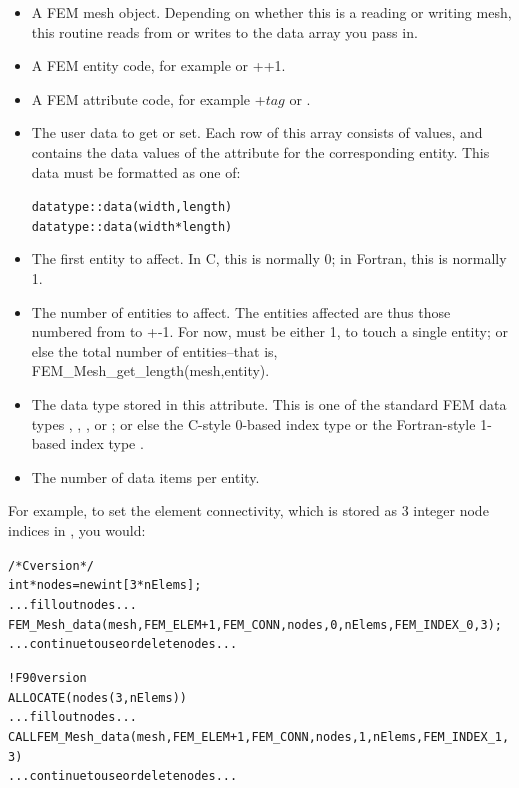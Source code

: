 \begin{itemize}
\item {} A FEM mesh object.  Depending on whether this is
   a reading or writing mesh, this routine reads from or writes to
   the data array you pass in.

\item {} A FEM entity code, for example  or
   ++1.

\item {} A FEM attribute code, for example +$tag$
   or .  
 
\item {} The user data to get or set.  Each row of this array consists
  of  values, and contains the data values of the attribute for the
  corresponding entity.  This data must be formatted as one of:
  \begin{alltt}
      datatype :: data(width,length)
      datatype :: data(width*length)
  \end{alltt}

\item {} The first entity to affect.  In C, this is normally 0;
  in Fortran, this is normally 1.

\item {} The number of entities to affect.  The entities
  affected are thus those numbered from  to +-1.
  For now,  must be either 1, to touch a single entity; or
  else the total number of entities--that is, FEM\_Mesh\_get\_length(mesh,entity).

\item {} The data type stored in this attribute.  This
  is one of the standard FEM data types , , 
  , or ; or else the C-style 0-based
  index type  or the Fortran-style 1-based index type
  .

\item {} The number of data items per entity. 

\end{itemize}

For example, to set the element connectivity, which is stored as 
3 integer node indices in , you would:

  \begin{alltt}
/* C version */
   int *nodes=new int[3*nElems];
   ... fill out nodes ...
   FEM\_Mesh\_data(mesh,FEM\_ELEM+1,FEM\_CONN, nodes, 0,nElems, FEM\_INDEX\_0, 3);
   ... continue to use or delete nodes ...
   
! F90 version
   ALLOCATE(nodes(3,nElems))
   ... fill out nodes ...
   CALL FEM\_Mesh\_data(mesh,FEM\_ELEM+1,FEM\_CONN, nodes, 1,nElems, FEM\_INDEX\_1, 3)
   ... continue to use or delete nodes ...
  \end{alltt}

